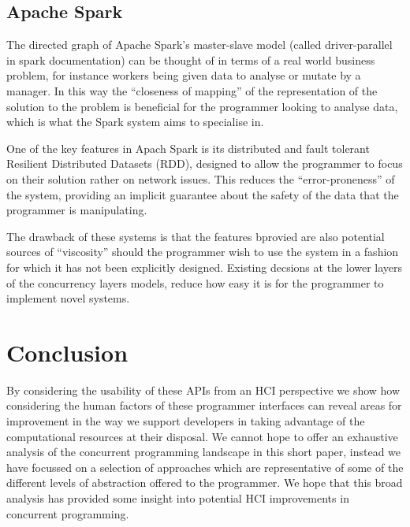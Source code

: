 \documentclass{sig-alternate}
\begin{document}
\subsection{Apache Spark}
The directed graph of Apache Spark's master-slave model (called driver-parallel in spark documentation) can be thought of in terms of a real world business problem, for instance workers being given data to analyse or mutate by a manager. In this way the ``closeness of mapping'' of the representation of the solution to the problem is beneficial for the programmer looking to analyse data, which is what the Spark system aims to specialise in.

One of the key features in Apach Spark is its distributed and fault tolerant Resilient Distributed Datasets (RDD), designed to allow the programmer to focus on their solution rather on network issues. This reduces the ``error-proneness'' of the system, providing an implicit guarantee about the safety of the data that the programmer is manipulating. 

The drawback of these systems is that the features bprovied are also potential sources of ``viscosity'' should the programmer wish to use the system in a fashion for which it has not been explicitly designed. Existing decsions at the lower layers of the concurrency layers models, reduce how easy it is for the programmer to implement novel systems.

\section{Conclusion}
By considering the usability of these APIs from an HCI perspective we show how considering the human factors of these programmer interfaces can reveal areas for improvement in the way we support developers in taking advantage of the computational resources at their disposal. We cannot hope to offer an exhaustive analysis of the concurrent programming landscape in this short paper, instead we have focussed on a selection of approaches which are representative of some of the different levels of abstraction offered to the programmer. We hope that this broad analysis has provided some insight into potential HCI improvements in concurrent programming.



\end{document}
